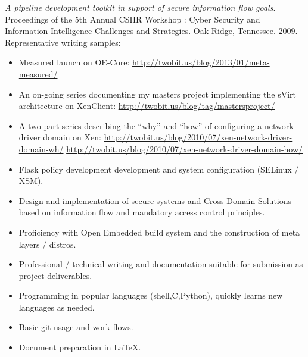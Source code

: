 \documentclass[letterpaper,11pt]{article}
\begin{document}
    {\it A pipeline development toolkit in support of secure information flow goals}.
    Proceedings of the 5th Annual CSIIR Workshop : Cyber Security and Information Intelligence Challenges and Strategies.
    Oak Ridge, Tennessee.
    2009.\\
    Representative writing samples:
    \begin {itemize}
      \setlength {\itemsep}{1pt}
      \setlength {\parskip}{0pt}
      \setlength {\parsep}{0pt}
    \item
      Measured launch on OE-Core:
      \url {http://twobit.us/blog/2013/01/meta-measured/}
    \item
      An on-going series documenting my masters project implementing the sVirt architecture on XenClient:
      \url {http://twobit.us/blog/tag/mastersproject/}
    \item
      A two part series describing the ``why'' and ``how'' of configuring a network driver domain on Xen:
      \url {http://twobit.us/blog/2010/07/xen-network-driver-domain-wh/}
      \url {http://twobit.us/blog/2010/07/xen-network-driver-domain-how/}
    \end {itemize}

    \begin {itemize}
      \setlength {\itemsep}{1pt}
      \setlength {\parskip}{0pt}
      \setlength {\parsep}{0pt}
      \item Flask policy development development and system configuration (SELinux / XSM).
      \item Design and implementation of secure systems and Cross Domain Solutions based on information flow and mandatory access control principles.
      \item Proficiency with Open Embedded build system and the construction of meta layers / distros.
      \item Professional / technical writing and documentation suitable for submission as project deliverables.
      \item Programming in popular languages (shell,C,Python), quickly learns new languages as needed.
      \item Basic git usage and work flows.
      \item Document preparation in \LaTeX.
    \end {itemize}
\end{document}
